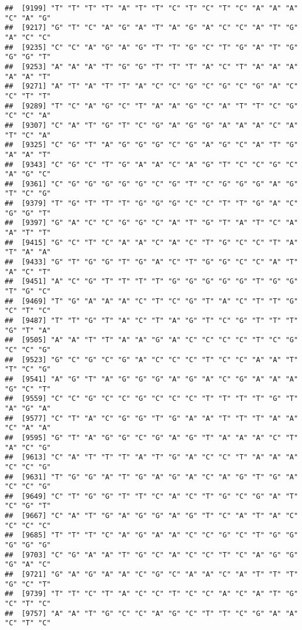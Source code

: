 \documentclass[
]{article}
\begin{document}
\begin{verbatim}
##  [9199] "T" "T" "T" "T" "A" "T" "T" "C" "T" "C" "T" "C" "A" "A" "A" "C" "A" "G"
##  [9217] "G" "T" "C" "A" "G" "A" "T" "A" "G" "A" "C" "C" "A" "T" "G" "A" "C" "C"
##  [9235] "C" "C" "A" "G" "A" "G" "T" "T" "G" "C" "T" "G" "A" "T" "G" "G" "G" "T"
##  [9253] "A" "A" "A" "T" "G" "G" "T" "T" "T" "A" "C" "T" "A" "A" "A" "A" "A" "T"
##  [9271] "A" "T" "A" "T" "T" "A" "C" "C" "G" "C" "G" "C" "G" "A" "C" "C" "T" "T"
##  [9289] "T" "C" "A" "G" "C" "T" "A" "A" "G" "C" "A" "T" "T" "C" "G" "C" "C" "A"
##  [9307] "C" "A" "T" "G" "T" "C" "G" "A" "G" "G" "A" "A" "A" "C" "A" "T" "C" "A"
##  [9325] "C" "G" "T" "A" "G" "G" "G" "C" "G" "A" "G" "C" "A" "T" "G" "A" "A" "T"
##  [9343] "C" "G" "C" "T" "G" "A" "A" "C" "A" "G" "T" "C" "C" "G" "C" "A" "G" "C"
##  [9361] "C" "G" "G" "G" "G" "G" "C" "G" "T" "C" "G" "G" "G" "A" "G" "T" "C" "G"
##  [9379] "T" "G" "T" "T" "T" "G" "G" "G" "C" "C" "T" "T" "G" "A" "C" "G" "G" "T"
##  [9397] "G" "A" "C" "C" "G" "G" "C" "A" "T" "G" "T" "A" "T" "C" "A" "A" "T" "T"
##  [9415] "G" "C" "T" "C" "A" "A" "C" "A" "C" "T" "G" "C" "C" "T" "A" "T" "A" "A"
##  [9433] "G" "T" "G" "G" "T" "G" "A" "C" "T" "G" "G" "C" "C" "A" "T" "A" "C" "T"
##  [9451] "A" "C" "G" "T" "T" "T" "T" "G" "G" "G" "G" "G" "T" "G" "G" "T" "G" "C"
##  [9469] "T" "G" "A" "A" "A" "C" "T" "C" "G" "T" "A" "C" "T" "T" "G" "C" "T" "C"
##  [9487] "T" "T" "G" "T" "A" "C" "T" "A" "G" "T" "C" "G" "T" "T" "T" "G" "T" "A"
##  [9505] "A" "A" "T" "T" "A" "A" "G" "A" "C" "C" "C" "C" "T" "C" "G" "C" "C" "G"
##  [9523] "G" "C" "G" "C" "G" "A" "C" "C" "C" "T" "C" "C" "A" "A" "T" "T" "C" "G"
##  [9541] "A" "G" "T" "A" "G" "G" "G" "A" "G" "A" "C" "G" "A" "A" "A" "G" "C" "T"
##  [9559] "C" "C" "G" "C" "C" "G" "C" "C" "C" "T" "T" "T" "T" "G" "T" "A" "G" "A"
##  [9577] "C" "T" "A" "C" "G" "G" "T" "G" "A" "A" "T" "T" "T" "A" "A" "C" "A" "A"
##  [9595] "G" "T" "A" "G" "G" "C" "G" "A" "G" "T" "A" "A" "A" "C" "T" "A" "C" "G"
##  [9613] "C" "A" "T" "T" "T" "A" "T" "G" "A" "C" "C" "T" "A" "A" "A" "C" "C" "G"
##  [9631] "T" "G" "G" "A" "T" "G" "A" "G" "A" "C" "A" "G" "T" "G" "A" "C" "C" "G"
##  [9649] "C" "T" "G" "G" "T" "T" "C" "A" "C" "T" "G" "C" "G" "A" "T" "C" "G" "T"
##  [9667] "C" "A" "T" "G" "A" "G" "G" "A" "G" "T" "C" "A" "T" "A" "C" "C" "C" "C"
##  [9685] "T" "T" "T" "C" "A" "G" "A" "A" "C" "C" "G" "C" "T" "G" "G" "G" "G" "G"
##  [9703] "C" "G" "A" "A" "T" "G" "C" "A" "C" "C" "T" "C" "A" "G" "G" "G" "A" "C"
##  [9721] "G" "A" "G" "A" "A" "C" "G" "C" "A" "A" "C" "A" "T" "T" "T" "G" "C" "T"
##  [9739] "T" "T" "C" "T" "A" "C" "C" "T" "C" "C" "A" "C" "A" "T" "G" "C" "T" "C"
##  [9757] "A" "A" "T" "G" "C" "C" "A" "G" "C" "T" "T" "C" "G" "A" "A" "C" "T" "C"

\end{verbatim}
\end{document}
